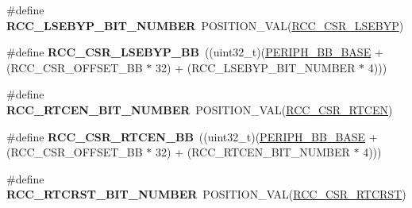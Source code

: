 \begin{DoxyCompactItemize}
\item 
\hypertarget{group___r_c_c___bit_address___alias_region_ga099cfa567c89f8643f7671d84ba18a7b}{\#define {\bfseries R\-C\-C\-\_\-\-L\-S\-E\-B\-Y\-P\-\_\-\-B\-I\-T\-\_\-\-N\-U\-M\-B\-E\-R}~P\-O\-S\-I\-T\-I\-O\-N\-\_\-\-V\-A\-L(\hyperlink{group___peripheral___registers___bits___definition_ga2f5198ce9785eab7b8a483b092ff067b}{R\-C\-C\-\_\-\-C\-S\-R\-\_\-\-L\-S\-E\-B\-Y\-P})}\label{group___r_c_c___bit_address___alias_region_ga099cfa567c89f8643f7671d84ba18a7b}

\item 
\hypertarget{group___r_c_c___bit_address___alias_region_ga8638f2321c343d7d985fe122717ea6e4}{\#define {\bfseries R\-C\-C\-\_\-\-C\-S\-R\-\_\-\-L\-S\-E\-B\-Y\-P\-\_\-\-B\-B}~((uint32\-\_\-t)(\hyperlink{group___peripheral__memory__map_gaed7efc100877000845c236ccdc9e144a}{P\-E\-R\-I\-P\-H\-\_\-\-B\-B\-\_\-\-B\-A\-S\-E} + (R\-C\-C\-\_\-\-C\-S\-R\-\_\-\-O\-F\-F\-S\-E\-T\-\_\-\-B\-B $\ast$ 32) + (R\-C\-C\-\_\-\-L\-S\-E\-B\-Y\-P\-\_\-\-B\-I\-T\-\_\-\-N\-U\-M\-B\-E\-R $\ast$ 4)))}\label{group___r_c_c___bit_address___alias_region_ga8638f2321c343d7d985fe122717ea6e4}

\item 
\hypertarget{group___r_c_c___bit_address___alias_region_gac4074d20c157f0892c6effb8bf22c8d7}{\#define {\bfseries R\-C\-C\-\_\-\-R\-T\-C\-E\-N\-\_\-\-B\-I\-T\-\_\-\-N\-U\-M\-B\-E\-R}~P\-O\-S\-I\-T\-I\-O\-N\-\_\-\-V\-A\-L(\hyperlink{group___peripheral___registers___bits___definition_gaf06cc284da6687ccce83abb3696613f9}{R\-C\-C\-\_\-\-C\-S\-R\-\_\-\-R\-T\-C\-E\-N})}\label{group___r_c_c___bit_address___alias_region_gac4074d20c157f0892c6effb8bf22c8d7}

\item 
\hypertarget{group___r_c_c___bit_address___alias_region_ga5cea2372c8b6876cdabe0d47b8ecbf64}{\#define {\bfseries R\-C\-C\-\_\-\-C\-S\-R\-\_\-\-R\-T\-C\-E\-N\-\_\-\-B\-B}~((uint32\-\_\-t)(\hyperlink{group___peripheral__memory__map_gaed7efc100877000845c236ccdc9e144a}{P\-E\-R\-I\-P\-H\-\_\-\-B\-B\-\_\-\-B\-A\-S\-E} + (R\-C\-C\-\_\-\-C\-S\-R\-\_\-\-O\-F\-F\-S\-E\-T\-\_\-\-B\-B $\ast$ 32) + (R\-C\-C\-\_\-\-R\-T\-C\-E\-N\-\_\-\-B\-I\-T\-\_\-\-N\-U\-M\-B\-E\-R $\ast$ 4)))}\label{group___r_c_c___bit_address___alias_region_ga5cea2372c8b6876cdabe0d47b8ecbf64}

\item 
\hypertarget{group___r_c_c___bit_address___alias_region_gad338a94b4f6ff8afde3baed311dbce80}{\#define {\bfseries R\-C\-C\-\_\-\-R\-T\-C\-R\-S\-T\-\_\-\-B\-I\-T\-\_\-\-N\-U\-M\-B\-E\-R}~P\-O\-S\-I\-T\-I\-O\-N\-\_\-\-V\-A\-L(\hyperlink{group___peripheral___registers___bits___definition_ga98f3b508ec0e52edc9c9fd22e292a3a5}{R\-C\-C\-\_\-\-C\-S\-R\-\_\-\-R\-T\-C\-R\-S\-T})}\label{group___r_c_c___bit_address___alias_region_gad338a94b4f6ff8afde3baed311dbce80}


\end{DoxyCompactItemize}
